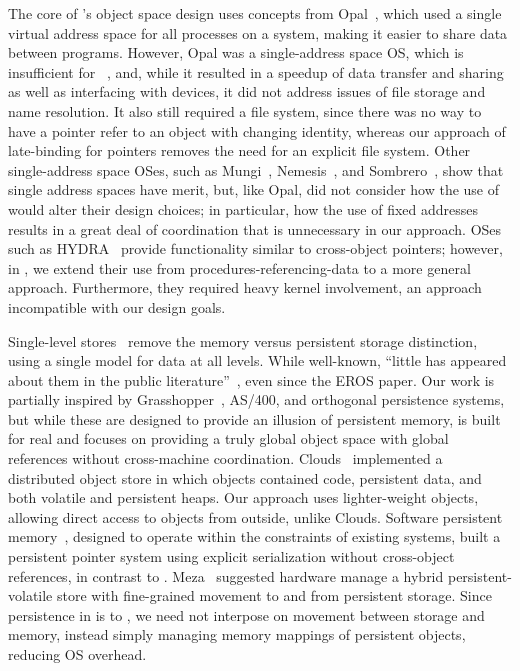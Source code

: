 {    The core of \Twizzler's object space design uses concepts
    from Opal~\cite{chase:tocs94}, which used a single virtual
    address space for all processes on a system, making it easier to share
    data between programs. However, Opal was a single-address space OS, which is insufficient for
    \NVM~\cite{bittman:plos19,bittman:hotstorage19},
    and, while it resulted in a speedup of data transfer and sharing as well as interfacing with
    devices, it did not address issues of file storage and name resolution. It also
    still required a file
    system, since there was no way to have a pointer refer to an object with changing identity,
    whereas our approach
    of late-binding for pointers
    removes the need for an explicit file system.  Other single-address space
    OSes, such as Mungi~\cite{heiser:scse9314},
    Nemesis~\cite{roscoe:osr94}, and Sombrero~\cite{skousen:ipccc99}, show that
    single address spaces have merit, but, like Opal, did not consider how the use
    of \NVM would alter their design choices; in particular, how the use of fixed addresses
    results in a great deal of coordination that is unnecessary in our approach.
    OSes such as HYDRA~\cite{wulf:cacm74} provide functionality similar to cross-object pointers;
    however, in \Twizzler, we extend their use from procedures-referencing-data to
    a more general approach. Furthermore, they required
    heavy kernel involvement, an approach incompatible with
    our design goals.

    Single-level stores~\cite{shapiro:usenix02,shekita:uwtr956,dearle:cs94} remove the
    memory versus persistent storage distinction, using a single model for data
    at all levels. While well-known,
    ``little has appeared about them in the public
    literature''~\cite{shapiro:usenix02}, even since the EROS paper.
    Our work is partially inspired by Grasshopper~\cite{dearle:cs94}, AS/400, and orthogonal persistence systems,
    but while these are designed to provide an illusion of persistent
    memory, \Twizzler is built for real \NVM and focuses on providing a truly global object space with
    global references without cross-machine coordination.
    Clouds~\cite{dasgupta:computer91} implemented a distributed object store in
    which objects contained code, persistent data, and both volatile and
    persistent heaps. Our approach uses lighter-weight objects, allowing direct
    access to objects from outside, unlike Clouds. Software persistent
    memory~\cite{guerra:atc12}, designed to operate within the constraints
    of existing systems, built a persistent pointer system using explicit
    serialization without cross-object references, in contrast to \Twizzler.
    Meza~\cite{meza:weed13}
    suggested hardware manage a hybrid persistent-volatile store with
    fine-grained movement to and from persistent storage. Since
    persistence in \Twizzler is to \NVM, we need not interpose on
    movement between storage and memory,
    instead simply managing memory mappings of persistent objects,
    reducing OS overhead.

}
